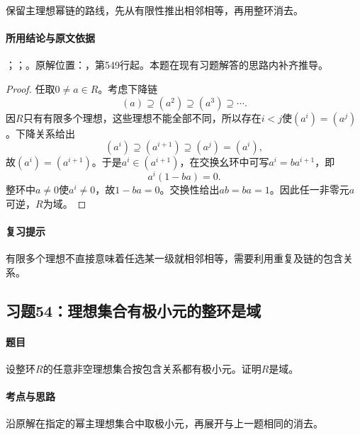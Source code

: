 保留主理想幂链的路线，先从有限性推出相邻相等，再用整环消去。

\paragraph{所用结论与原文依据}

；；。原解位置：，第549行起。本题在现有习题解答的思路内补齐推导。


\begin{proof}

任取$0\ne a\in R$。考虑下降链
\[
(a)\supseteq(a^2)\supseteq(a^3)\supseteq\cdots.
\]
因$R$只有有限多个理想，这些理想不能全部不同，所以存在$i<j$使$(a^i)=(a^j)$。下降关系给出
\[
(a^i)\supseteq(a^{i+1})\supseteq(a^j)=(a^i),
\]
故$(a^i)=(a^{i+1})$。于是$a^i\in(a^{i+1})$，在交换幺环中可写$a^i=ba^{i+1}$，即
\[
a^i(1-ba)=0.
\]
整环中$a\ne0$使$a^i\ne0$，故$1-ba=0$。交换性给出$ab=ba=1$。因此任一非零元$a$可逆，$R$为域。

\end{proof}

\paragraph{复习提示}

有限多个理想不直接意味着任选某一级就相邻相等，需要利用重复及链的包含关系。



\subsection{习题54：理想集合有极小元的整环是域}

\label{ex:3:54}

\paragraph{题目}

设整环$R$的任意非空理想集合按包含关系都有极小元。证明$R$是域。

\paragraph{考点与思路}

沿原解在指定的幂主理想集合中取极小元，再展开与上一题相同的消去。

